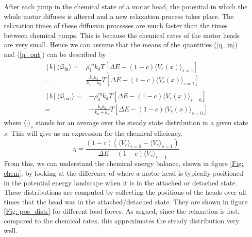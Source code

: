 \documentclass[aps,pre,twocolumn,showpacs,showkeys]{revtex4-1}
\begin{document}
After each jump in the chemical state of a motor head, the potential in which the whole motor diffuses is altered and a new relaxation process takes place. 
The relaxation times of these diffusion processes are much faster than the times between chemical jumps. 
This is because the chemical rates of the motor heads are very small. 
Hence we can assume that the means of the quantities (\ref{q_in}) and (\ref{q_out}) can be described by
\begin{gather}
\begin{aligned}[b]
\langle \mathcal Q_\text{in} \rangle 
=& \rho^{eq}_1 k_d T\left[ \Delta E - (1-c)\langle V_r(x) \rangle_{s=1} \right] \\
=& \frac{k_a k_d}{k_a + k_d}T\left[\Delta E - (1-c)\langle V_r(x) \rangle_{s=1} \right] 
\end{aligned}
\label{Q_in} \\
\begin{aligned}[b]
\langle \mathcal Q_\text{out} \rangle 
=& -\rho^{eq}_0 k_a T\left[ \Delta E - (1-c)\langle V_r(x) \rangle_{s=0} \right] \\
=& -\frac{k_a k_d}{k_a + k_d} T\left[ \Delta E - (1-c)\langle V_r(x) \rangle_{s=0} \right] 
\end{aligned}
\label{Q_out}
\end{gather}
where $\langle \cdot \rangle_{s}$ stands for an average over the steady state distribution in a given state $s$. 
This will give us an expression for the chemical efficiency.
\begin{equation}
\eta = \frac{ (1-c) \left( \langle V_r \rangle_{s=0} - \langle V_r \rangle_{s=1} \right) }{ \Delta E - (1-c) \langle V_r \rangle_{s=1} } \label{eta}
\end{equation}
From this, we can understand the chemical energy balance, shown in figure \ref{Fig: chem}, by looking at the difference of where a motor head is typically positioned in the potential energy landscape when it is in the attached or detached state. 
These distributions are computed by collecting the positions of the heads over all times that the head was in the attached/detached state. 
They are shown in figure \ref{Fig: pos_distr} for different load forces. 
As argued, since the relaxation is fast, compared to the chemical rates, this approximates the steady distribution very well.
\end{document}
